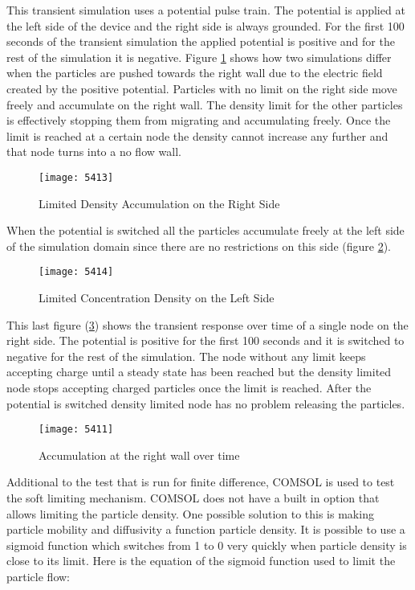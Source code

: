 \begin{doublespace}
This transient simulation uses a potential pulse train. The potential is applied at the left side of the device and the right side is always grounded. For the first 100 seconds of the transient simulation the applied potential is positive and for the rest of the simulation it is negative. Figure \ref{5413} shows how two simulations differ when the particles are pushed towards the right wall due to the electric field created by the positive potential. Particles with no limit on the right side move freely and accumulate on the right wall. The density limit for the other particles is effectively stopping them from migrating and accumulating freely. Once the limit is reached at a certain node the density cannot increase any further and that node turns into a no flow wall. 

\begin{figure}[!htp]
\centering
\texttt{[image: 5413]}
\caption{Limited Density Accumulation on the Right Side} 
\label{5413}
\end{figure}

When the potential is switched all the particles accumulate freely at the left side of the simulation domain since there are no restrictions on this side (figure \ref{5414}).

\begin{figure}[!htp]
\centering
\texttt{[image: 5414]}
\caption{Limited Concentration Density on the Left Side} 
\label{5414}
\end{figure}

This last figure (\ref{5411}) shows the transient response over time of a single node on the right side. The potential is positive for the first 100 seconds and it is switched to negative for the rest of the simulation. The node without any limit keeps accepting charge until a steady state has been reached but the density limited node stops accepting charged particles once the limit is reached. After the potential is switched density limited node has no problem releasing the particles.


\begin{figure}[!htp]
\centering
\texttt{[image: 5411]}
\caption{Accumulation at the right wall over time} 
\label{5411}
\end{figure}

Additional to the test that is run for finite difference, COMSOL is used to test the soft limiting mechanism. COMSOL does not have a built in option that allows limiting the particle density. One possible solution to this is making particle mobility and diffusivity a function particle density. It is possible to use a sigmoid function which switches from 1 to 0 very quickly when particle density is close to its limit. Here is the equation of the sigmoid function used to limit the particle flow:


\end{doublespace}
